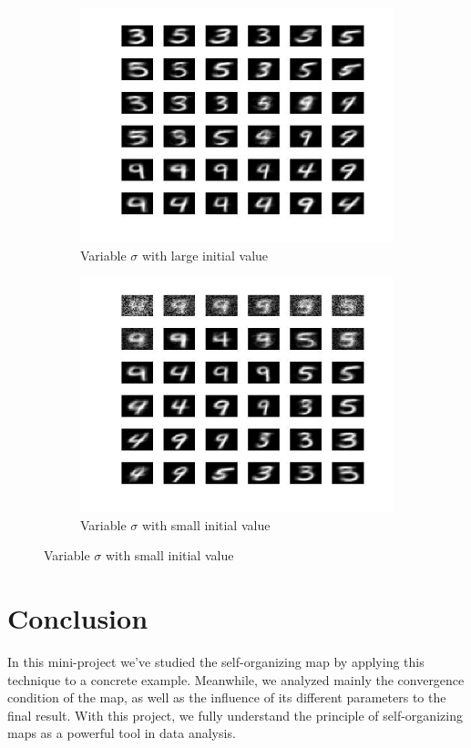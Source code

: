 \documentclass[a4paper, 12pt]{article}
\begin{document}
\begin{figure}[h]
  \begin{minipage}[c]{0.45\textwidth}
    \begin{figure}[H]
      \centering
      \includegraphics[scale=0.4]{../figure/sigmaLarge.jpg}
      \caption{Variable $\sigma$ with large initial value}
    \end{figure}
  \end{minipage}%
  \hspace{0.5cm}
  \begin{minipage}[c]{0.45\textwidth}
    \begin{figure}[H]
      \centering
      \includegraphics[scale=0.4]{../figure/sigmaSmall.jpg}
      \caption{Variable $\sigma$ with small initial value}
    \end{figure}
  \end{minipage}
\end{figure}
\section{Conclusion}
In this mini-project we've studied the self-organizing map by applying
this technique to a concrete example. Meanwhile, we analyzed
mainly the convergence condition of the map, as well as the influence of its
different parameters to the final result. With this project, we fully
understand the principle of self-organizing maps as a powerful tool in
data analysis.
\end{document}
